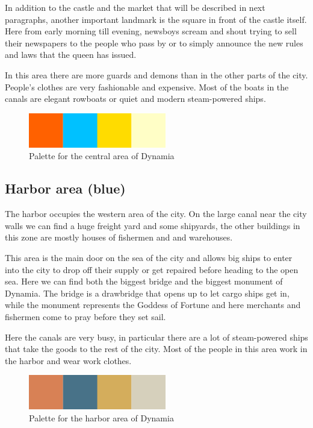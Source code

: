 In addition to the castle and the market that will be described in next paragraphs, another important landmark is the square in front of the castle itself. Here from early morning till evening, newsboys scream and shout trying to sell their newspapers to the people who pass by or to simply announce the new rules and laws that the queen has issued.

In this area there are more guards and demons than in the other parts of the city. People's clothes are very fashionable and expensive. Most of the boats in the canals are elegant rowboats or quiet and modern steam-powered ships.

\begin{figure}[H]
  \centering
  \includegraphics[width=6cm]{Images/Palettes/dynamiaCentralArea}
  \caption{Palette for the central area of Dynamia}
\end{figure}

\subsection{Harbor area (blue)}
The harbor occupies the western area of the city. On the large canal near the city walls we can find a huge freight yard and some shipyards, the  other buildings in this zone are mostly houses of fishermen and and warehouses.

This area is the main door on the sea of the city and allows big ships to enter into the city to drop off their supply or get repaired before heading to the open sea. Here we can find both the biggest bridge and the biggest monument of Dynamia. The bridge is a drawbridge that opens up to let cargo ships get in, while the monument represents the Goddess of Fortune and here merchants and fishermen come to pray before they set sail.

Here the canals are very busy, in particular there are a lot of steam-powered ships that take the goods to the rest of the city. Most of the people in this area work in the harbor and wear work clothes.

\begin{figure}[H]
  \centering
  \includegraphics[width=6cm]{Images/Palettes/dynamiaHarborArea}
  \caption{Palette for the harbor area of Dynamia}
\end{figure}

